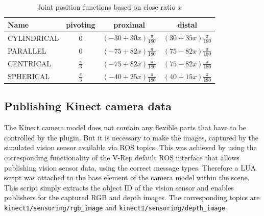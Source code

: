 \begin{table}[h]
  \centering
  \label{fig:grasp_defs}
  \begin{tabular}{|l|c|c|c|} \hline
	\textbf{Name} & \textbf{pivoting} & \textbf{proximal} & \textbf{distal} \\ \hline
	CYLINDRICAL & $0$ & $(-30+30x)\frac{\pi}{180}$ & $(30 + 35x)\frac{\pi}{180}$ \\
	PARALLEL & $0$ & $(-75+82x)\frac{\pi}{180}$ & $(75-82x)\frac{\pi}{180}$ \\
	CENTRICAL & $\frac{\pi}{3}$ & $(-75+82x)\frac{\pi}{180}$ & $(75-82x)\frac{\pi}{180}$ \\
	SPHERICAL & $\frac{\pi}{3}$ & $(-40+25x)\frac{\pi}{180}$ & $(40+15x)\frac{\pi}{180}$ \\ \hline
  \end{tabular}
  \caption{Joint position functions based on close ratio $x$}
\end{table}

\subsection{Publishing Kinect camera data}

The Kinect camera model does not contain any flexible parts that have to be controlled by the plugin. But it is necessary to make the images, captured by the simulated vision sensor available via ROS topics. This was achieved by using the corresponding functionality of the V-Rep default ROS interface that allows publishing vision sensor data, using the correct message types. Therefore a LUA script was attached to the base element of the camera model within the scene. This script simply extracts the object ID of the vision sensor and enables publishers for the captured RGB and depth images. The corresponding topics are \texttt{kinect1/sensoring/rgb\_image} and \texttt{kinect1/sensoring/depth\_image}. 
